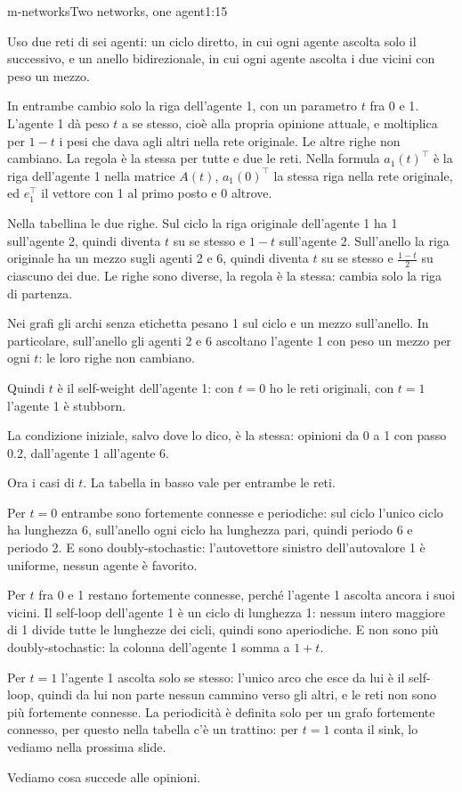 \begin{slidedue}{m-networks}{Two networks, one agent}{1:15}
  \begin{discorso}
    \item Uso due reti di sei agenti: un ciclo diretto, in cui ogni agente ascolta solo il successivo, e un anello bidirezionale, in cui ogni agente ascolta i due vicini con peso un mezzo.
    \item In entrambe cambio solo la riga dell'agente 1, con un parametro $t$ fra 0 e 1. L'agente 1 dà peso $t$ a se stesso, cioè alla propria opinione attuale, e moltiplica per $1-t$ i pesi che dava agli altri nella rete originale. Le altre righe non cambiano. La regola è la stessa per tutte e due le reti. Nella formula $a_1(t)^\top$ è la riga dell'agente 1 nella matrice $A(t)$, $a_1(0)^\top$ la stessa riga nella rete originale, ed $e_1^\top$ il vettore con 1 al primo posto e 0 altrove.
    \item Nella tabellina le due righe. Sul ciclo la riga originale dell'agente 1 ha 1 sull'agente 2, quindi diventa $t$ su se stesso e $1-t$ sull'agente 2. Sull'anello la riga originale ha un mezzo sugli agenti 2 e 6, quindi diventa $t$ su se stesso e $\frac{1-t}{2}$ su ciascuno dei due. Le righe sono diverse, la regola è la stessa: cambia solo la riga di partenza.
    \item Nei grafi gli archi senza etichetta pesano 1 sul ciclo e un mezzo sull'anello. In particolare, sull'anello gli agenti 2 e 6 ascoltano l'agente 1 con peso un mezzo per ogni $t$: le loro righe non cambiano.
    \item Quindi $t$ è il self-weight dell'agente 1: con $t=0$ ho le reti originali, con $t=1$ l'agente 1 è stubborn.
    \item La condizione iniziale, salvo dove lo dico, è la stessa: opinioni da 0 a 1 con passo 0.2, dall'agente 1 all'agente 6.
    \item \clic Ora i casi di $t$. La tabella in basso vale per entrambe le reti.
    \item Per $t=0$ entrambe sono fortemente connesse e periodiche: sul ciclo l'unico ciclo ha lunghezza 6, sull'anello ogni ciclo ha lunghezza pari, quindi periodo 6 e periodo 2. E sono doubly-stochastic: l'autovettore sinistro dell'autovalore 1 è uniforme, nessun agente è favorito.
    \item Per $t$ fra 0 e 1 restano fortemente connesse, perché l'agente 1 ascolta ancora i suoi vicini. Il self-loop dell'agente 1 è un ciclo di lunghezza 1: nessun intero maggiore di 1 divide tutte le lunghezze dei cicli, quindi sono aperiodiche. E non sono più doubly-stochastic: la colonna dell'agente 1 somma a $1+t$.
    \item Per $t=1$ l'agente 1 ascolta solo se stesso: l'unico arco che esce da lui è il self-loop, quindi da lui non parte nessun cammino verso gli altri, e le reti non sono più fortemente connesse. La periodicità è definita solo per un grafo fortemente connesso, per questo nella tabella c'è un trattino: per $t=1$ conta il sink, lo vediamo nella prossima slide.
    \item Vediamo cosa succede alle opinioni.
  \end{discorso}
\end{slidedue}

